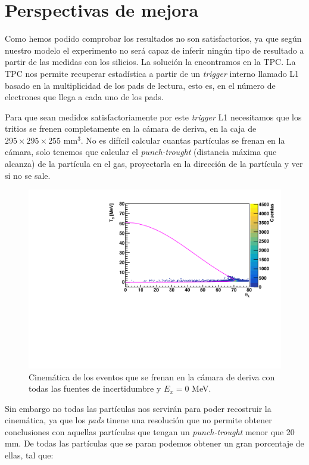 
\section{Perspectivas de mejora}

Como hemos podido comprobar los resultados no son satisfactorios, ya que según nuestro modelo el experimento no será capaz de inferir ningún tipo de resultado a partir de las medidas con los silicios. La solución la encontramos en la TPC. La TPC nos permite recuperar estadística a partir de un \textit{trigger} interno llamado L1 basado en la multiplicidad de los pads de lectura, esto es, en el número de electrones que llega a cada uno de los pads.

Para que sean medidos satisfactoriamente por este \textit{trigger} L1 necesitamos que los tritios se frenen completamente en la cámara de deriva, en la caja de $295 \times 295 \times 255 $ mm$^{3}$. No es difícil calcular cuantas partículas se frenan en la cámara, solo tenemos que calcular el \textit{punch-trought} (distancia máxima que alcanza) de la partícula en el gas, proyectarla en la dirección de la partícula y ver si no se sale. 

\begin{figure}[H] \centering
    \includegraphics[width=0.6\linewidth]{Imagenes/Trigger/EkinMeasuredL1_Ex0.00_incIdx0.pdf}
    \caption{Cinemática de los eventos que se frenan en la cámara de deriva con todas las fuentes de incertidumbre y $E_x=0$ MeV.}
\end{figure}



Sin embargo no todas las partículas nos servirán para poder recostruir la cinemática, ya que los \textit{pads} tinene una resolución que no permite obtener conclusiones con aquellas partículas que tengan un \textit{punch-trought} menor que 20 mm. De todas las partículas que se paran podemos obtener un gran porcentaje de ellas, tal que: 


